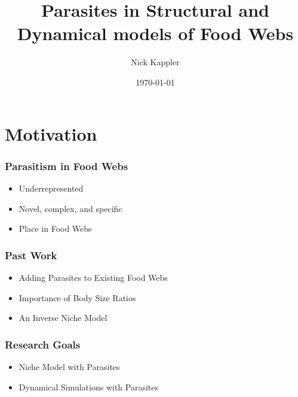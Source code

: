\documentclass{beamer}
\title{Parasites in Structural and Dynamical models of Food Webs}
\author{Nick Kappler}
\date{\today}
\begin{document}
\frame{\titlepage}

\section[Outline]{}
\frame{\tableofcontents}

\section{Motivation}

\begin{frame}
\frametitle{Parasitism in Food Webs}
\begin{itemize}[<+->]
\item  Underrepresented
\item  Novel, complex, and specific
\item  Place in Food Webs
\end{itemize}
\end{frame}

\begin{frame}
\frametitle{Past Work}
\begin{itemize}[<+->]
\item  Adding Parasites to Existing Food Webs%
\item  Importance of Body Size Ratios %
\item  An Inverse Niche Model %
\end{itemize}
\end{frame}

\begin{frame}
\frametitle{Research Goals}
\begin{itemize}[<+->]
\item Niche Model with Parasites
\item  Dynamical Simulations with Parasites
\end{itemize}
\end{frame}
\end{document}
